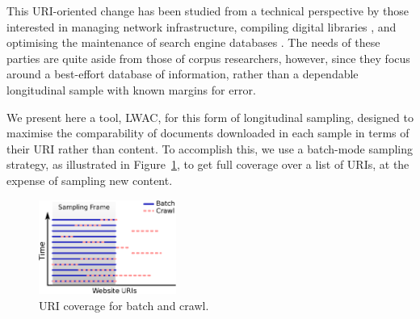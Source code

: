 \documentclass[11pt]{article}
\newcommand{\toolname}{LWAC}
\begin{document}
This URI-oriented change has been studied from a technical perspective by those interested in managing network infrastructure, compiling digital libraries%
, and optimising the maintenance of search engine databases%
.  The needs of these parties are quite aside from those of corpus researchers, however, since they focus around a best-effort database of information, rather than a dependable longitudinal sample with known margins for error.
% 
% 


We present here a tool, \toolname, for this form of longitudinal sampling, designed to maximise the comparability of documents downloaded in each sample in terms of their URI rather than content.  To accomplish this, we use a batch-mode sampling strategy, as illustrated in Figure~\ref{fig:sampling}, to get full coverage over a list of URIs, at the expense of sampling new content.

\begin{figure}[h]
\centering
\includegraphics[width=0.4\textwidth]{images/samples.eps}
\caption{URI coverage for batch and crawl.}
\label{fig:sampling}
\end{figure}
\end{document}
